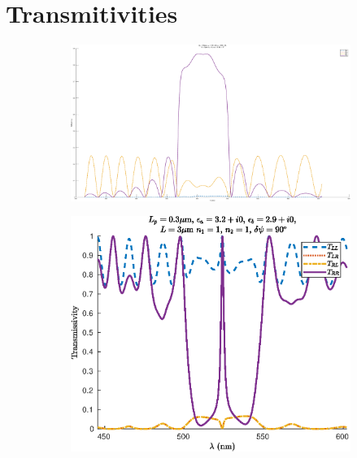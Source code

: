 \chapter{Transmitivities}
\label{chap:transmitivities}

\begin{figure}
	\centering
	\begin{subfigure}{0.49\linewidth}
		\includegraphics[width=\linewidth]{plots/defect/no_defect/oseen_transmission}
		\caption{}
	\end{subfigure}
	\begin{subfigure}{0.49\linewidth}
		\includegraphics[width=\linewidth]{plots/defect/reflectivity/oseen_transmission}
		\caption{}
	\end{subfigure}
	\begin{subfigure}{0.49\linewidth}

\end{subfigure}
\end{figure}
